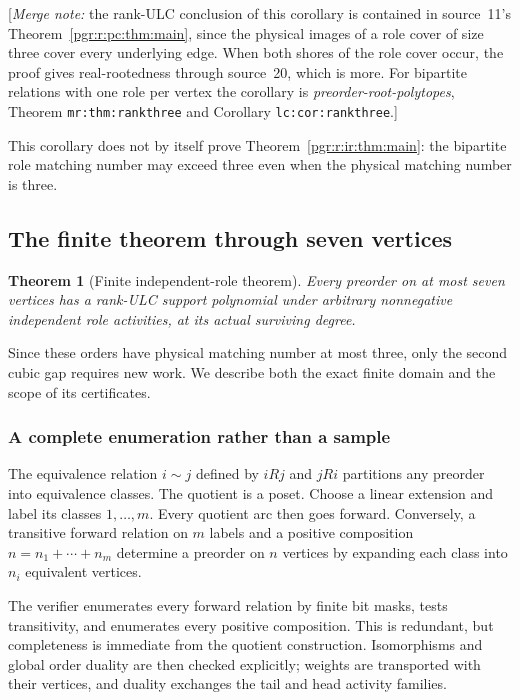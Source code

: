 \documentclass[11pt]{article}
\numberwithin{equation}{section}
\newtheorem{theorem}{Theorem}[section]\newtheorem{lemma}[theorem]{Lemma}\newtheorem{proposition}[theorem]{Proposition}\newtheorem{corollary}[theorem]{Corollary}
\theoremstyle{definition}\newtheorem{definition}[theorem]{Definition}\newtheorem{remark}[theorem]{Remark}
\newcommand{\mnote}[1]{[\textit{Merge note:} #1]}
\newcommand{\prp}{\emph{preorder-root-polytopes}}
\begin{document}
\mnote{the rank-ULC conclusion of this corollary is contained in source~11's
Theorem~\ref{pgr:r:pc:thm:main}, since the physical images of a role cover
of size three cover every underlying edge. When both shores of the role
cover occur, the proof gives real-rootedness through source~20, which is
more. For bipartite relations with one role per vertex the corollary is
\prp, Theorem \texttt{mr:thm:rankthree} and Corollary
\texttt{lc:cor:rankthree}.}

This corollary does not by itself prove Theorem~\ref{pgr:r:ir:thm:main}: the bipartite role matching number may exceed three even when the physical matching number is three.

\subsection{The finite theorem through seven vertices}\label{pgr:r:ir:sec:finite}
\begin{theorem}[Finite independent-role theorem]\label{pgr:r:ir:thm:finite}
Every preorder on at most seven vertices has a rank-ULC support polynomial under arbitrary nonnegative independent role activities, at its actual surviving degree.
\end{theorem}
Since these orders have physical matching number at most three, only the second cubic gap requires new work. We describe both the exact finite domain and the scope of its certificates.

\subsubsection{A complete enumeration rather than a sample}
The equivalence relation $i\sim j$ defined by $iRj$ and $jRi$ partitions any preorder into equivalence classes. The quotient is a poset. Choose a linear extension and label its classes $1,\ldots,m$. Every quotient arc then goes forward. Conversely, a transitive forward relation on $m$ labels and a positive composition $n=n_1+\cdots+n_m$ determine a preorder on $n$ vertices by expanding each class into $n_i$ equivalent vertices.

The verifier enumerates every forward relation by finite bit masks, tests transitivity, and enumerates every positive composition. This is redundant, but completeness is immediate from the quotient construction. Isomorphisms and global order duality are then checked explicitly; weights are transported with their vertices, and duality exchanges the tail and head activity families.
\end{document}
